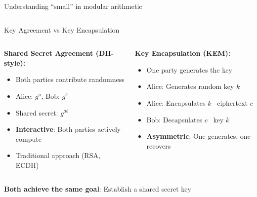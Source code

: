 \documentclass[aspectratio=169, lualatex, handout]{beamer}
\begin{document}
\begin{frame}{Understanding ``small'' in modular arithmetic}
\begin{columns}[c]
\begin{column}{0.35\textwidth}
\begin{center}
			\end{center}
		\end{column}
	\end{columns}
\end{frame}

\begin{frame}{Key Agreement vs Key Encapsulation}
	\begin{columns}[c]
		\begin{column}{0.5\textwidth}
			\textbf{Shared Secret Agreement (DH-style):}
			\begin{itemize}
				\item Both parties contribute randomness
				\item Alice: $g^a$, Bob: $g^b$
				\item Shared secret: $g^{ab}$
				\item \textbf{Interactive}: Both parties actively compute
				\item Traditional approach (RSA, ECDH)
			\end{itemize}
		\end{column}
		\begin{column}{0.5\textwidth}
			\textbf{Key Encapsulation (KEM):}
			\begin{itemize}
				\item One party generates the key
				\item Alice: Generates random key $k$
				\item Alice: Encapsulates $k$ \rightarrow\ ciphertext $c$
				\item Bob: Decapsulates $c$ \rightarrow\ key $k$
				\item \textbf{Asymmetric}: One generates, one recovers
			\end{itemize}
		\end{column}
	\end{columns}
	\vspace{5mm}
	\begin{center}
		\textbf{Both achieve the same goal}: Establish a shared secret key
	\end{center}
\end{frame}
\end{document}
